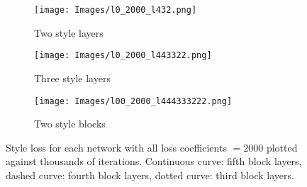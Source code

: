 \documentclass[a4paper,twoside]{article}
\begin{document}
\vspace{-6cm}
\begin{figure*}
    \centering
     \begin{subfigure}{.33\textwidth}
     \centering
     \texttt{[image: Images/l0\_2000\_l432.png]}
     \caption{Two style layers} 
          \label{fig:conv1}
\end{subfigure}\hfill
     \begin{subfigure}{.33\textwidth}
     \centering
     \texttt{[image: Images/l0\_2000\_l443322.png]}
     \caption{Three style layers}
     \label{fig:conv2}
     \end{subfigure}\hfill
     \begin{subfigure}{.33\textwidth}
     \centering
     \texttt{[image: Images/l00\_2000\_l444333222.png]}
     \caption{Two style blocks}
      \label{fig:conv3}

     \end{subfigure}\hfill
    \caption{Style loss for each network with all loss coefficients $=2000$ plotted against thousands of iterations. Continuous curve: fifth block layers, dashed curve: fourth block layers, dotted curve: third block layers.}
    \label{fig:loss_convergence}
\end{figure*}
\end{document}
